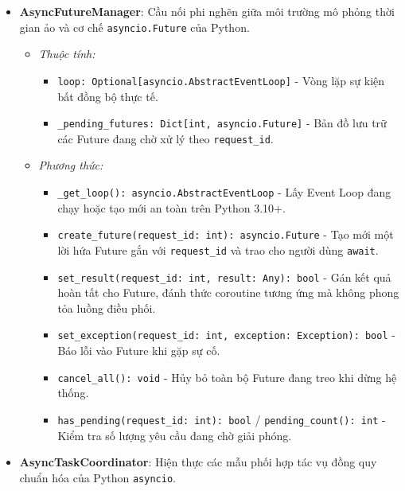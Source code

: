 \begin{itemize}[leftmargin=1.5em, itemsep=8pt]
\item \textbf{AsyncFutureManager}: Cầu nối phi nghẽn giữa môi trường mô phỏng thời gian ảo và cơ chế \texttt{asyncio.Future} của Python.

\begin{itemize}[leftmargin=1.2em, label={}, itemsep=3pt]
\item[\textendash] \textit{Thuộc tính:}
\begin{itemize}[leftmargin=1.5em, label=+, itemsep=2pt]
\item \texttt{loop: Optional[asyncio.AbstractEventLoop]} - Vòng lặp sự kiện bất đồng bộ thực tế.
\item \texttt{\_pending\_futures: Dict[int, asyncio.Future]} - Bản đồ lưu trữ các Future đang chờ xử lý theo \texttt{request\_id}.
\end{itemize}

\item[\textendash] \textit{Phương thức:}
\begin{itemize}[leftmargin=1.5em, label=+, itemsep=2pt]
\item \texttt{\_get\_loop(): asyncio.AbstractEventLoop} - Lấy Event Loop đang chạy hoặc tạo mới an toàn trên Python 3.10+.
\item \texttt{create\_future(request\_id: int): asyncio.Future} - Tạo mới một lời hứa Future gắn với \texttt{request\_id} và trao cho người dùng \texttt{await}.
\item \texttt{set\_result(request\_id: int, result: Any): bool} - Gán kết quả hoàn tất cho Future, đánh thức coroutine tương ứng mà không phong tỏa luồng điều phối.
\item \texttt{set\_exception(request\_id: int, exception: Exception): bool} - Báo lỗi vào Future khi gặp sự cố.
\item \texttt{cancel\_all(): void} - Hủy bỏ toàn bộ Future đang treo khi dừng hệ thống.
\item \texttt{has\_pending(request\_id: int): bool} / \texttt{pending\_count(): int} - Kiểm tra số lượng yêu cầu đang chờ giải phóng.
\end{itemize}
\end{itemize}

\item \textbf{AsyncTaskCoordinator}: Hiện thực các mẫu phối hợp tác vụ đồng quy chuẩn hóa của Python \texttt{asyncio}.


\end{itemize}
